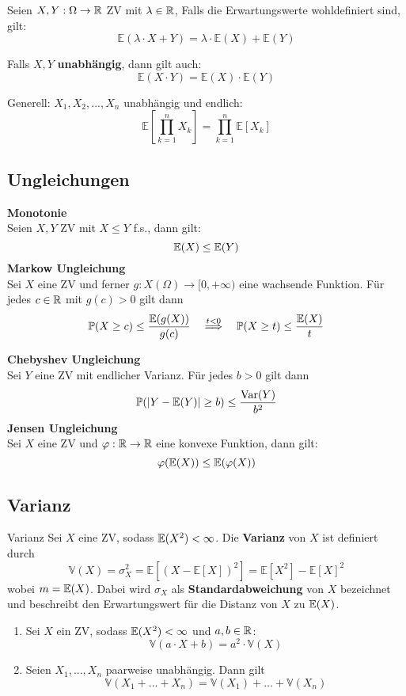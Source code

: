 Seien $X, Y: \Omega \to \mathbb{R}$ ZV mit $\lambda \in \mathbb{R}$, Falls die Erwartungswerte wohldefiniert sind, gilt:
$$\mathbb{E}(\lambda \cdot X + Y) = \lambda \cdot \mathbb{E}(X) + \mathbb{E}(Y)$$

Falls $X, Y$ \textbf{unabhängig}, dann gilt auch:
$$\mathbb{E}(X \cdot Y) = \mathbb{E}(X) \cdot \mathbb{E}(Y)$$

Generell: $X_1, X_2, ...,X_n$ unabhängig und endlich:
$$\mathbb{E}\left[\prod_{k=1}^{n} X_{k}\right]=\prod_{k=1}^{n} \mathbb{E}\left[X_{k}\right]$$

\subsection{Ungleichungen}
\textbf{Monotonie}
\\Seien $X, Y$ ZV mit $X \leq Y$ f.s., dann gilt:
$$\mathbb{E}(X) \leq \mathbb{E}(Y)$$
\textbf{Markow Ungleichung}
\\Sei $X$ eine ZV und ferner $g: X(\Omega) \to [0, +\infty)$ eine wachsende Funktion. Für jedes $c \in \mathbb{R}$ mit $g(c) > 0$ gilt dann
$$\mathbb{P}(X \geq c) \leq \frac{\mathbb{E}(g(X))}{g(c)}\quad \overset{t<0}\Longrightarrow \quad  \mathbb{P}(X \geq t) \leq \frac{\mathbb{E}(X)}{t}$$

\textbf{Chebyshev Ungleichung}
\\Sei $Y$ eine ZV mit endlicher Varianz. Für jedes $b > 0$ gilt dann
$$\mathbb{P}(|Y - \mathbb{E}(Y)| \geq b) \leq \frac{\text{Var}(Y)}{b^2}$$
\textbf{Jensen Ungleichung}
\\Sei $X$ eine ZV und $\varphi: \mathbb{R} \to \mathbb{R}$ eine konvexe Funktion, dann gilt:
$$\varphi(\mathbb{E}(X)) \leq \mathbb{E}(\varphi(X))$$

\subsection{Varianz}
\begin{mainbox}{Varianz}
    Sei $X$ eine ZV, sodass $\mathbb{E}(X^2)<\infty$. Die \textbf{Varianz} von $X$ ist definiert durch
    $$\mathbb{V}(X) = \sigma_X^2 =\mathbb{E}\left[(X-\mathbb{E}[X])^2\right]=\mathbb{E}\left[X^2\right]-\mathbb{E}[X]^2$$
    wobei $m = \mathbb{E}(X)$. Dabei wird $\sigma_X$ als \textbf{Standardabweichung} von $X$ bezeichnet und beschreibt den Erwartungswert für die Distanz von $X$ zu $\mathbb{E}(X)$.
\end{mainbox}

\begin{enumerate}
    \item Sei $X$ ein ZV, sodass $\mathbb{E}(X^2)<\infty$ und $a, b \in \mathbb{R}$:
    $$\mathbb{V}(a\cdot X + b) = a^2 \cdot \mathbb{V}(X)$$
    \item Seien $X_1, ..., X_n$ paarweise unabhängig. Dann gilt
    $$\mathbb{V}(X_1 + \ldots + X_n) = \mathbb{V}(X_1)+\ldots +\mathbb{V}(X_n)$$
\end{enumerate}

